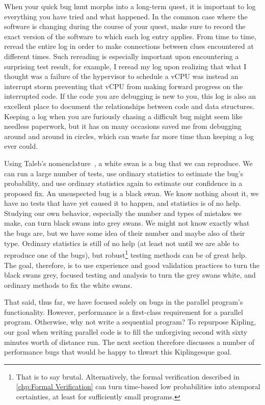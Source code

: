 When your quick bug hunt morphs into a long-term quest, it is important
to log everything you have tried and what happened.
In the common case where the software is changing during the course of
your quest, make sure to record the exact version of the software to
which each log entry applies.
From time to time, reread the entire log in order to make connections
between clues encountered at different times.
Such rereading is especially important upon encountering a surprising
test result, for example, I reread my log upon realizing that what I
thought was a failure of the hypervisor to schedule a vCPU was instead
an interrupt storm preventing that vCPU from making forward progress
on the interrupted code.
If the code you are debugging is new to you, this log is also an
excellent place to document the relationships between code and data
structures.
Keeping a log when you are furiously chasing a difficult bug might seem
like needless paperwork, but it has on many occasions saved me from
debugging around and around in circles, which can waste far more time
than keeping a log ever could.

Using Taleb's nomenclature~\cite{NassimTaleb2007BlackSwan},
a white swan is a bug that we can reproduce.
We can run a large number of tests, use ordinary statistics to
estimate the bug's probability, and use ordinary statistics again
to estimate our confidence in a proposed fix.
An unsuspected bug is a black swan.
We know nothing about it, we have no tests that have yet caused it
to happen, and statistics is of no help.
Studying our own behavior, especially the number and types of mistakes
we make, can turn black swans into grey swans.
We might not know exactly what the bugs are, but we have some idea of
their number and maybe also of their type.
Ordinary statistics is still of no help (at least not until we are
able to reproduce one of the bugs), but robust\footnote{
	That is to say brutal.
	Alternatively, the formal verification described in
	\cref{chp:Formal Verification}
	can turn time-based low probabilities into atemporal certainties,
	at least for sufficiently small programs.}
testing methods can be of great help.
The goal, therefore, is to use experience and good validation practices
to turn the black swans grey, focused testing and analysis to turn the
grey swans white, and ordinary methods to fix the white swans.

That said, thus far, we have focused solely on bugs in the parallel program's
functionality.
However, performance is a first-class requirement for a parallel program.
Otherwise, why not write a sequential program?
To repurpose Kipling, our goal when writing parallel code is to fill
the unforgiving second with sixty minutes worth of distance run.
The next section therefore discusses a number of performance bugs that
would be happy to thwart this Kiplingesque goal.

